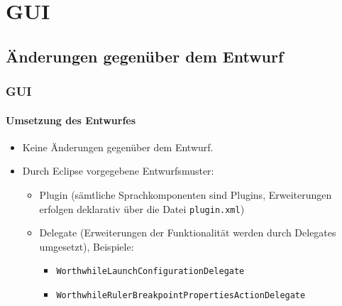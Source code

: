 \section{GUI}
\subsection{Änderungen gegenüber dem Entwurf}

\begin{frame}
\frametitle{GUI}
\framesubtitle{Umsetzung des Entwurfes}
\begin{itemize}
	\item Keine Änderungen gegenüber dem Entwurf.
	\item Durch Eclipse vorgegebene Entwurfsmuster:
	\begin{itemize}
		\item Plugin (sämtliche Sprachkomponenten sind Plugins, Erweiterungen erfolgen deklarativ über die Datei \texttt{plugin.xml})
		\item Delegate (Erweiterungen der Funktionalität werden durch Delegates umgesetzt), Beispiele:
		\begin{itemize}
			\item \texttt{WorthwhileLaunchConfigurationDelegate}
			\item \texttt{WorthwhileRulerBreakpointPropertiesActionDelegate}			
		\end{itemize}
	\end{itemize}
\end{itemize}
\end{frame}

